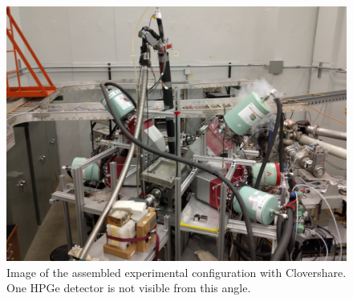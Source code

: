 \begin{figure}
    \centering
    \includegraphics[scale=0.1]{Setup_Figs/IMG_20160311_192243.jpg}
    \caption{Image of the assembled experimental configuration with Clovershare. One HPGe detector is not visible from this angle.}
    \label{fig:clovershare_config}
\end{figure}